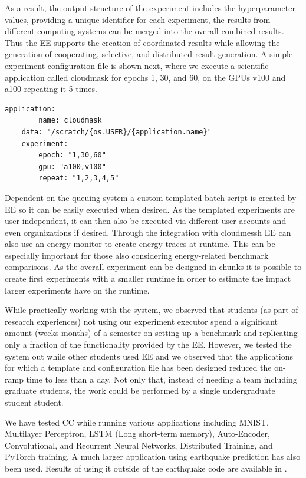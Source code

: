 \documentclass[utf8]{FrontiersinVancouver} %
\begin{document}
As a result, the output structure of the experiment includes the hyperparameter values, providing a unique identifier for each experiment, the results from different computing systems can be merged into the overall combined results. Thus the EE supports the creation of coordinated results while allowing the generation of cooperating, selective, and distributed result generation. A simple experiment configuration file is shown next, where we execute a scientific application called cloudmask for epochs 1, 30, and 60, on the GPUs v100 and a100 repeating it 5 times.

{\scriptsize
\begin{lstlisting}[breaklines=true]
    application:
        name: cloudmask
    data: "/scratch/{os.USER}/{application.name}"
    experiment:
        epoch: "1,30,60"
        gpu: "a100,v100"
        repeat: "1,2,3,4,5"
\end{lstlisting}
}

Dependent on the queuing system a custom templated batch script is created by EE so it can be easily executed when desired.
As the templated experiments are user-independent, it can then also be executed via different user accounts and even organizations if desired. Through the integration with cloudmessh EE can also use an energy monitor to create energy traces at runtime. This can be especially important for those also considering energy-related benchmark comparisons. As the overall experiment can be designed in chunks it is possible to create first experiments with a smaller runtime in order to estimate the impact larger experiments have on the runtime. 

While practically working with the system, we observed that students (as part of research experiences) not using our experiment executor spend a significant amount (weeks-months) of a semester on setting up a benchmark and replicating only a fraction of the functionality provided by the EE. However, we tested the system out while other students used EE and we observed that the applications for which a template and configuration file has been designed reduced the on-ramp time to less than a day. Not only that, instead of needing a team including graduate students, the work could be performed by a single undergraduate student student.

We have tested CC while running various applications including MNIST, Multilayer Perceptron, LSTM (Long short-term memory), Auto-Encoder, Convolutional, and Recurrent Neural Networks, Distributed Training, and PyTorch training.  A much larger application using earthquake prediction has also been used. Results of using it outside of the earthquake code are available in 
\cite{las-2023-escience}.
\end{document}
